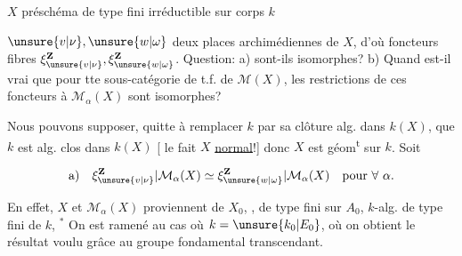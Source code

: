 $X$  préschéma de type fini  irréductible sur corps $k$

$\unsure{v|\nu},\unsure{w|\omega}$ deux places archimédiennes de  $X$, d'où foncteurs fibres
$\xi_{\unsure{v|\nu}}^{\mathbf Z},\xi_{\unsure{w|\omega}}^{\mathbf Z}$.
Question: a)  sont-ils isomorphes?
b)  Quand est-il vrai que pour tte sous-catégorie  de t.f. de $\mathcal M(X)$, les restrictions de ces foncteurs à $\mathcal M_\alpha(X)$ sont isomorphes?

Nous pouvons supposer, quitte à remplacer $k$ par
sa clôture alg. dans $k(X)$, que $k$ est alg. clos dans $k(X)$ [ le fait $X$ \uline{normal}!]
donc $X$ est géom\textsuperscript{t}  sur $k$.
Soit  

\[
\text{a)}\quad \xi_{\unsure{v|\nu}}^{\mathbf Z}|\mathcal M_\alpha(X)
\simeq \xi_{\unsure{w|\omega}}^{\mathbf Z}|\mathcal M_\alpha(X)
\quad\text{pour }\forall\ \alpha.
\]


En effet, $X$ et $\mathcal M_\alpha(X)$ proviennent de $X_0$, , de type fini sur $A_0$, $k$-alg. de type fini de $k$,
 $^*$
On est ramené au cas où $k=\unsure{k_0|E_0}$, où on obtient le résultat voulu grâce au groupe fondamental transcendant.


